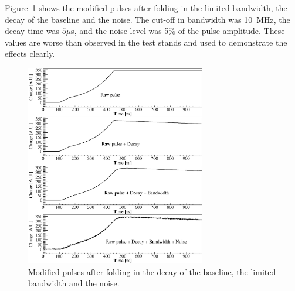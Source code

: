 Figure~\ref{fig:pss:elec} shows the modified pulses after folding in the limited bandwidth, the decay of the baseline and the noise. The cut-off in bandwidth was 10~MHz, the decay time was $5 \mu$s, and the noise level was 5\% of the pulse amplitude. These values are worse than observed in the test stands and used to demonstrate the effects clearly.
\begin{figure}[htbp]
\centering
\includegraphics[width=0.7\textwidth]{PSDBN}
\caption{Modified pulses after folding in the decay of the baseline, the limited bandwidth and the noise.}
\label{fig:pss:elec}
\end{figure}


